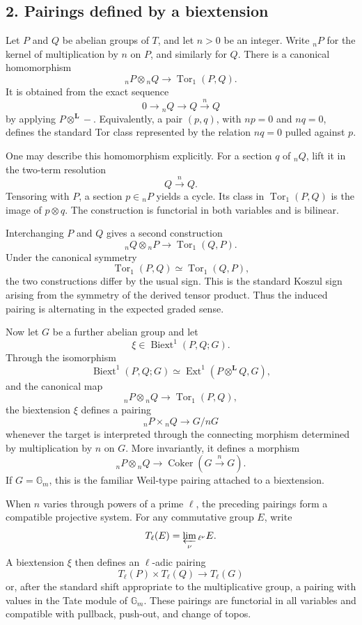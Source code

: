 \documentclass[11pt]{article}
\theoremstyle{plain}
\theoremstyle{definition}
\theoremstyle{remark}
\DeclareMathOperator{\Ext}{Ext}
\DeclareMathOperator{\Tor}{Tor}
\DeclareMathOperator{\Biext}{Biext}
\newcommand{\Gm}{\mathbb G_m}
\newcommand{\bL}{\mathbf L}
\begin{document}
\subsection*{2. Pairings defined by a biextension}

Let \(P\) and \(Q\) be abelian groups of \(T\), and let \(n>0\) be an integer.
Write \({}_nP\) for the kernel of multiplication by \(n\) on \(P\), and similarly
for \(Q\). There is a canonical homomorphism
\[
{}_nP\otimes {}_nQ\longrightarrow \Tor_1(P,Q).
\]
It is obtained from the exact sequence
\[
0\to {}_nQ\to Q\xrightarrow{n}Q
\]
by applying \(P\otimes^{\bL}-\). Equivalently, a pair
\((p,q)\), with \(np=0\) and \(nq=0\), defines the standard Tor class represented
by the relation \(nq=0\) pulled against \(p\).

One may describe this homomorphism explicitly. For a section \(q\) of
\({}_nQ\), lift it in the two-term resolution
\[
Q\xrightarrow{n}Q.
\]
Tensoring with \(P\), a section \(p\in {}_nP\) yields a cycle. Its class in
\(\Tor_1(P,Q)\) is the image of \(p\otimes q\). The construction is functorial
in both variables and is bilinear.

Interchanging \(P\) and \(Q\) gives a second construction
\[
{}_nQ\otimes {}_nP\longrightarrow \Tor_1(Q,P).
\]
Under the canonical symmetry
\[
\Tor_1(P,Q)\simeq \Tor_1(Q,P),
\]
the two constructions differ by the usual sign. This is the standard Koszul sign
arising from the symmetry of the derived tensor product. Thus the induced pairing
is alternating in the expected graded sense.

Now let \(G\) be a further abelian group and let
\[
\xi\in \Biext^1(P,Q;G).
\]
Through the isomorphism
\[
\Biext^1(P,Q;G)\simeq \Ext^1(P\otimes^{\bL}Q,G),
\]
and the canonical map
\[
{}_nP\otimes {}_nQ\to \Tor_1(P,Q),
\]
the biextension \(\xi\) defines a pairing
\[
{}_nP\times {}_nQ\longrightarrow G/nG
\]
whenever the target is interpreted through the connecting morphism determined by
multiplication by \(n\) on \(G\). More invariantly, it defines a morphism
\[
{}_nP\otimes {}_nQ\longrightarrow
\operatorname{Coker}(G\xrightarrow{n}G).
\]
If \(G=\Gm\), this is the familiar Weil-type pairing attached to a biextension.

When \(n\) varies through powers of a prime \(\ell\), the preceding pairings form
a compatible projective system. For any commutative group \(E\), write
\[
T_\ell(E)=\varprojlim_\nu {}_{\ell^\nu}E.
\]
A biextension \(\xi\) then defines an \(\ell\)-adic pairing
\[
T_\ell(P)\times T_\ell(Q)\longrightarrow T_\ell(G)
\]
or, after the standard shift appropriate to the multiplicative group, a pairing
with values in the Tate module of \(\Gm\). These pairings are functorial in all
variables and compatible with pullback, push-out, and change of topos.
\end{document}
